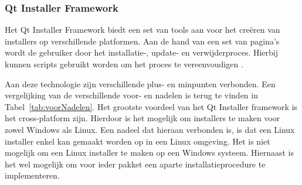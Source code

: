\subsubsection{Qt Installer Framework}
Het Qt Installer Framework biedt een set van tools aan voor het creëren van installers op verschillende platformen.
Aan de hand van een set van pagina's wordt de gebruiker door het installatie-, update- en verwijderproces.
Hierbij kunnen scripts gebruikt worden om het proces te vereenvoudigen \citep{qtDoc}.

Aan deze technologie zijn verschillende plus- en minpunten verbonden.
Een vergelijking van de verschillende voor- en nadelen is terug te vinden in Tabel~\ref{tab:voorNadelen}.
Het grootste voordeel van het Qt Installer framework is het cross-platform zijn.
Hierdoor is het mogelijk om installers te maken voor zowel Windows als Linux.
Een nadeel dat hieraan verbonden is, is dat een Linux installer enkel kan gemaakt worden op in een Linux omgeving.
Het is niet mogelijk om een Linux installer te maken op een Windows systeem.
Hiernaast is het wel mogelijk om voor ieder pakket een aparte installatieprocedure te implementeren.



